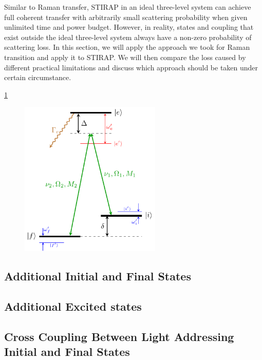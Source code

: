 Similar to Raman transfer, STIRAP in an ideal three-level system can achieve
full coherent transfer with arbitrarily small scattering probability
when given unlimited time and power budget.
However, in reality, states and coupling that exist outside the ideal three-level system
always have a non-zero probability of scattering loss.
In this section, we will apply the approach we took for Raman transition
and apply it to STIRAP. We will then compare the loss caused by different practical limitations
and discuss which approach should be taken under certain circumstance.

\ref{fig:raman-transfer-generic-stirap-model}

\begin{figure}
  \centering
  \includegraphics[width=0.6\textwidth]{figures/raman_transfer_generic_raman_model.pdf}
  \caption[Generic model for a real STIRAP]{
    \todo{}
    \label{fig:raman-transfer-generic-stirap-model}}
\end{figure}

\subsection{Additional Initial and Final States}

\subsection{Additional Excited states}

\subsection{Cross Coupling Between Light Addressing Initial and Final States}

